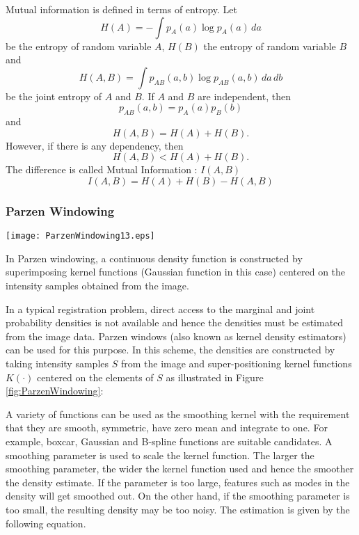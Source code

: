 Mutual information is defined in terms of entropy. Let
\begin{equation}
H(A) = - \int p_A(a) \log p_A(a)\, da
\end{equation}
be the entropy of random variable $A$, $H(B)$ the entropy of
random variable $B$ and
\begin{equation}
H(A,B) = \int p_{AB}(a,b) \log p_{AB}(a,b)\,da\,db
\end{equation}
be the joint entropy of $A$ and $B$. If $A$ and $B$ are independent, then
\begin{equation}
p_{AB}(a,b) = p_A(a) p_B(b)
\end{equation}
and
\begin{equation}
H(A,B) = H(A) + H(B).
\end{equation}
However, if there is any dependency, then
\begin{equation}
H(A,B)<H(A)+H(B).
\end{equation}
The difference is called Mutual Information : \( I(A,B) \)
\begin{equation}
I(A,B)=H(A)+H(B)-H(A,B)
\end{equation}

\subsubsection{Parzen Windowing}


\begin{floatingfigure}[rlp]{0.5\textwidth}
 \centering
 \texttt{[image: ParzenWindowing13.eps]}
 \caption[Parzen Windowing in Mutual Information]{
In Parzen windowing, a continuous density function is constructed by
superimposing kernel functions (Gaussian function in this case) centered on the
intensity samples obtained from the image.\label{fig:ParzenWindowing}}
\end{floatingfigure}

In a typical registration problem, direct access to the marginal
and joint probability densities is not available and hence the
densities must be estimated from the image data. Parzen windows
(also known as kernel density estimators) can be used for this purpose.
In this scheme, the densities are constructed by taking intensity
samples $S$ from the image and super-positioning kernel functions
$K(\cdot)$ centered on the elements of $S$ as illustrated in
Figure \ref{fig:ParzenWindowing}:

A variety of functions can be used as the smoothing kernel with the
requirement that they are smooth, symmetric, have zero mean and
integrate to one. For example, boxcar, Gaussian and B-spline functions are
suitable candidates.  A smoothing parameter is used to scale the kernel
function.  The larger the smoothing parameter, the wider the kernel function
used and hence the smoother the density estimate. If the parameter is too
large, features such as modes in the density will get smoothed out.  On the
other hand, if the smoothing parameter is too small, the resulting density
may be too noisy. The estimation is given by the following equation.

